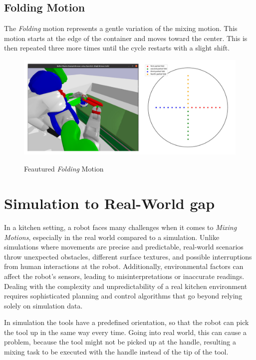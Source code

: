 \subsection{Folding Motion}
The \textit{Folding} motion represents a gentle variation of the mixing motion. This motion starts at the edge of the container and moves toward the center. This is then repeated three more times until the cycle restarts with a slight shift.
\begin{figure}[H]
    \includegraphics[scale=0.3]{Graphics/folding_showcase.jpg}
    \label{fig:foldingshowcase}
    \caption{Feautured \textit{Folding} Motion}
\end{figure}

\section{Simulation to Real-World gap}
\label{sec: simulation to real world gap}

In a kitchen setting, a robot faces many challenges when it comes to \textit{Mixing Motions}, especially in the real world compared to a simulation.
Unlike simulations where movements are precise and predictable, real-world scenarios throw unexpected obstacles, different surface textures, and possible interruptions from human interactions at the robot.
Additionally, environmental factors can affect the robot's sensors, leading to misinterpretations or inaccurate readings.
Dealing with the complexity and unpredictability of a real kitchen environment requires sophisticated planning and control algorithms that go beyond relying solely on simulation data.

In simulation the tools have a predefined orientation, so that the robot can pick the tool up in the same way every time.
Going into real world, this can cause a problem, because the tool might not be picked up at the handle, resulting
a mixing task to be executed with the handle instead of the tip of the tool.

